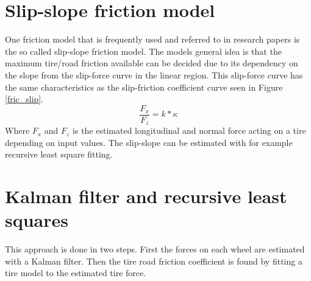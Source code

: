 \section{Slip-slope friction model}

One friction model that is frequently used and referred to in research papers is the so called slip-slope friction model. The models general idea is that the maximum tire/road friction available can be decided due to its dependency on the slope from the slip-force curve in the linear region. This slip-force curve has the same characteristics as the slip-friction coefficient curve seen in Figure \ref{fric_slip}. 
\begin{equation}
	\dfrac{F_{x}}{F_{z}} = k*\kappa
\end{equation}
Where $ F_{x} $ and $ F_{z} $ is the estimated longitudinal and normal force acting on a tire depending on input values. The slip-slope can be estimated with for example recursive least square fitting.


\section{Kalman filter and recursive least squares}
This approach is done in two steps. First the forces on each wheel are estimated with a Kalman filter. Then the tire road friction coefficient is found by fitting a tire model to the estimated tire force.
